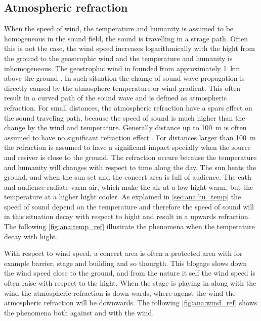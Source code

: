 \subsection{Atmospheric refraction}
When the speed of wind, the temperature and humanity is assumed to be homogeneous in the sound field, the sound is travelling in a strage path. Often this is not the case, the wind speed increases logarithmically with the hight from the ground to the geostrophic wind \citep{asmos_acous_2016} and the temperature and humanity is inhomogeneous. The geostrophic wind in founded from approximately \SI{1}{\kilo\meter} above the ground \citep{geostrophic_wind}.  In such situation the change of sound wave propagation is directly caused by the atmosphere temperature or wind gradient. This often result in a curved path of the sound wave and is defined as atmospheric refraction. For small distances, the atmospheric refraction have a spars effect on the sound traveling path, because the speed of sound is much higher than the change by the wind and temperature. Generally distance up to \SI{100}{\meter} is often assumed to have no significant refraction effect \citep{effect_of_wind}. For distances larger than \SI{100}{\meter} the refraction is assumed to have a significant impact specially when the source and resiver is close to the ground.  The refraction occure because the temperature and humanity will changes with respect to time along the day.  The sun heats the ground, and when the sun set and the concert area is full of audience. The eath and audience radiate varm air, which make the air at a low hight warm, but the temperature at a higher hight cooler. As explained in \autoref{sec:ana:hu_temp} the speed of sound depend on the temperature and therefore the speed of sound will in this situation decay with respect to hight and result in a upwards refraction. The following \autoref{fig:ana:temp_ref} illustrate the phenomena when the temperature decay with hight.



With respect to wind speed, a concert area is often a protected area with for example barrier, stage and building and so thourgth. This blogage slows down the wind speed close to the ground, and from the nature it self the wind speed is often raise with respect to the hight. When the stage is playing in along with the wind the atmospheric refraction is down wards, where agenst the wind the atmospheric refraction will be downwards. The following \autoref{fig:ana:wind_ref} shows the phenomena both against and with the wind.

